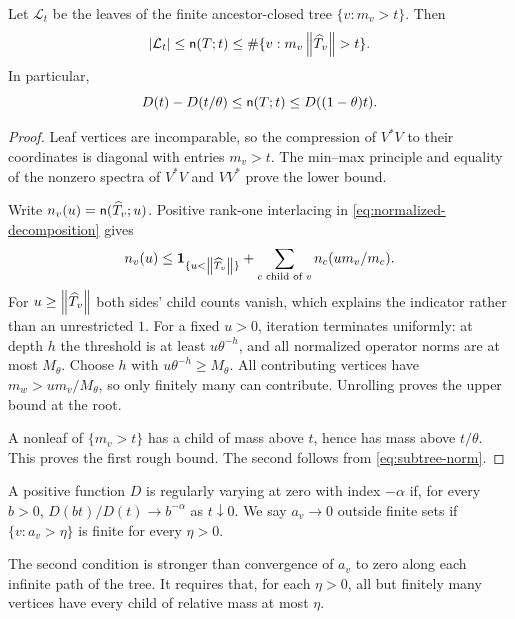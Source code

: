 \begin{proposition}\label{prop:sandwich}
Let $\mathcal L_t$ be the leaves of the finite ancestor-closed tree
$\{v:m_v>t\}$. Then
\begin{equation}\label{eq:sandwich}
 |\mathcal L_t|\le\mathsf n(T;t)
 \le\#\{v:m_v\left\lVert \widehat T_v\right\rVert>t\}.
\end{equation}
In particular,
\begin{equation}\label{eq:rough-sandwich}
 D(t)-D(t/\theta)\le\mathsf n(T;t)\le D((1-\theta)t).
\end{equation}
\end{proposition}
\begin{proof}
Leaf vertices are incomparable, so the compression of $V^*V$ to their
coordinates is diagonal with entries $m_v>t$. The min--max principle and
equality of the nonzero spectra of $V^*V$ and $VV^*$ prove the lower bound.

Write $n_v(u)=\mathsf n(\widehat T_v;u)$. Positive rank-one interlacing in
\eqref{eq:normalized-decomposition} gives
\[
 n_v(u)\le
 \mathbf 1_{\{u<\left\lVert \widehat T_v\right\rVert\}}
 +\sum_{c\text{ child of }v}n_c(um_v/m_c).
\]
For $u\ge\left\lVert \widehat T_v\right\rVert$ both sides' child counts vanish, which explains
the indicator rather than an unrestricted $1$. For a fixed $u>0$, iteration
terminates uniformly: at depth $h$ the threshold is at least $u\theta^{-h}$,
and all normalized operator norms are at most $M_\theta$. Choose $h$ with
$u\theta^{-h}\ge M_\theta$. All contributing vertices have
$m_w>um_v/M_\theta$, so only finitely many can contribute.
Unrolling proves the upper bound at the root.

A nonleaf of $\{m_v>t\}$ has a child of mass above $t$, hence has mass
above $t/\theta$. This proves the first rough bound. The second follows
from \eqref{eq:subtree-norm}.
\end{proof}

\begin{definition}\label{def:regvar}
A positive function $D$ is regularly varying at zero with index $-\alpha$
if, for every $b>0$, $D(bt)/D(t)\to b^{-\alpha}$ as $t\downarrow0$.
We say $a_v\to0$ outside finite sets if
$\{v:a_v>\eta\}$ is finite for every $\eta>0$.
\end{definition}
The second condition is stronger than convergence of $a_v$ to zero along
each infinite path of the tree. It requires that, for each $\eta>0$, all
but finitely many vertices have every child of relative mass at most
$\eta$.

